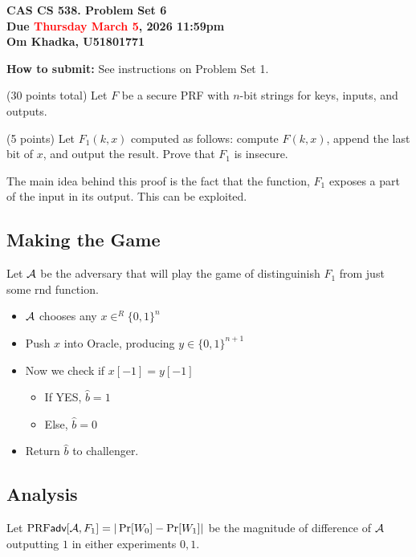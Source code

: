 \documentclass[12pt]{article}
\newif\ifsol
\theoremstyle{plain}
\theoremstyle{definition}
\begin{document}
\begin{center}
\Large{\textbf{CAS CS 538.  \ifsol Solutions to \fi Problem Set 6}}\\
\smallskip
\large{\textbf{Due \textcolor{red}{Thursday March 5}, 2026 11:59pm
}}\\
\large{\textbf{Om Khadka, U51801771}}
\end{center}

\noindent
\textbf{How to submit:}  See instructions on Problem Set 1. 


\begin{problem} (30 points total)
Let $F$ be a secure PRF with $n$-bit strings for keys, inputs, and outputs.

\begin{ppart} (5 points)
Let $F_1(k,x)$ computed as follows: compute $F(k, x)$, append the last bit of $x$, and output the result. Prove that $F_1$ is insecure.
\end{ppart}

\begin{solution}
The main idea behind this proof is the fact that the function, $F_1$ exposes a part of the input in its output. This can be exploited.

\subsection*{Making the Game}
Let $\mathcal{A}$ be the adversary that will play the game of distinguinish $F_1$ from just some rnd function.
\begin{itemize}
  \item $\mathcal{A}$ chooses any $x \in^R \{0, 1\}^n$
  \item Push $x$ into $\text{Oracle}$, producing $y \in \{0, 1\}^{n+1}$
  \item Now we check if $x[-1] = y[-1]$
  \begin{itemize}
    \item If YES, $\hat{b} = 1$
    \item Else, $\hat{b} = 0$
  \end{itemize}
  \item Return $\hat{b}$ to challenger.
\end{itemize}

\subsection*{Analysis}
Let $\textrm{PRF}\textsf{adv}[\mathcal{A}, F_1] = |\Pr[W_0] - \Pr[W_1]|$ be the magnitude of difference of $\mathcal{A}$ outputting $1$ in either experiments $0, 1$.


\end{solution}
\end{problem}
\end{document}
